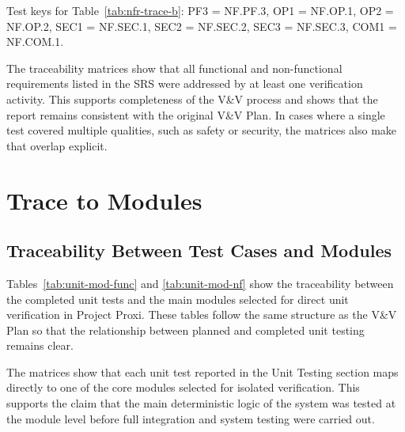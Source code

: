 \documentclass[12pt]{article}
\begin{document}
\noindent
Test keys for Table~\ref{tab:nfr-trace-b}:
PF3 = NF.PF.3, OP1 = NF.OP.1, OP2 = NF.OP.2,
SEC1 = NF.SEC.1, SEC2 = NF.SEC.2, SEC3 = NF.SEC.3, COM1 = NF.COM.1.


The traceability matrices show that all functional and non-functional
requirements listed in the SRS were addressed by at least one
verification activity. This supports completeness of the V\&V process
and shows that the report remains consistent with the original V\&V
Plan. In cases where a single test covered multiple qualities, such as
safety or security, the matrices also make that overlap explicit.
		
\section{Trace to Modules}

\subsection{Traceability Between Test Cases and Modules}

Tables~\ref{tab:unit-mod-func} and \ref{tab:unit-mod-nf} show the
traceability between the completed unit tests and the main modules
selected for direct unit verification in Project Proxi. These tables
follow the same structure as the V\&V Plan so that the relationship
between planned and completed unit testing remains clear.

The matrices show that each unit test reported in the Unit Testing
section maps directly to one of the core modules selected for isolated
verification. This supports the claim that the main deterministic
logic of the system was tested at the module level before full
integration and system testing were carried out.
\end{document}
